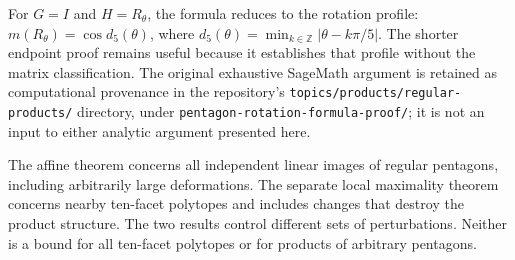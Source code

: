 For $G=I$ and $H=R_\theta$, the formula reduces to the rotation profile:
$m(R_\theta)=\cos d_5(\theta)$, where
$d_5(\theta)=\min_{k\in\mathbb Z}|\theta-k\pi/5|$.
The shorter endpoint proof remains useful because it establishes that profile
without the matrix classification. The original exhaustive SageMath argument
is retained as computational provenance in the repository's
\texttt{topics/products/regular-products/} directory, under
\texttt{pentagon-rotation-formula-proof/}; it is not an input to either
analytic argument presented here.

The affine theorem concerns all independent linear images of regular
pentagons, including arbitrarily large deformations. The separate local
maximality theorem concerns nearby ten-facet polytopes and includes changes
that destroy the product structure. The two results control different sets of
perturbations. Neither is a bound for all ten-facet polytopes or for products
of arbitrary pentagons.
